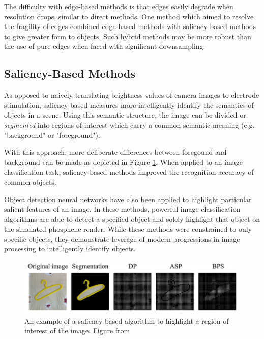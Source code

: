 \documentclass[a4paper,11pt,openany]{book}
\begin{document}
The difficulty with edge-based methods is that edges easily degrade when resolution drops, similar to direct methods. \cite{buffoni_image_2005}
One method which aimed to resolve the fragility of edges combined edge-based methods with saliency-based methods to give greater form to objects. \cite{han_object_2015}
Such hybrid methods may be more robust than the use of pure edges when faced with significant downsampling.

\subsection*{Saliency-Based Methods}
\label{sec:org947fef6}

As opposed to naively translating brightness values of camera images to electrode stimulation, saliency-based measures more intelligently identify the semantics of objects in a scene.
Using this semantic structure, the image can be divided or \emph{segmented} into regions of interest which carry a common semantic meaning (e.g. "background" or "foreground"). \cite{pal_review_1993}

With this approach, more deliberate differences between foregound and background can be made as depicted in Figure \ref{fig:org092176d}. \cite{guo_optimization_2018}
When applied to an image classification task, saliency-based methods improved the recognition accuracy of common objects. \cite{han_object_2015,li_image_2018}

Object detection neural networks have also been applied to highlight particular salient features of an image. \cite{mace_simulated_2015}
In these methods, powerful image classification algorithms are able to detect a specified object and solely highlight that object on the simulated phosphene render.
While these methods were constrained to only specific objects, they demonstrate leverage of modern progressions in image processing to intelligently identify objects.

\begin{figure}[htbp]
\centering
\includegraphics[width=.9\linewidth]{./graphics/litreview/saliency.png}
\caption{\label{fig:org092176d}
An example of a saliency-based algorithm to highlight a region of interest of the image. Figure from \cite{li_image_2018}}
\end{figure}
\end{document}
